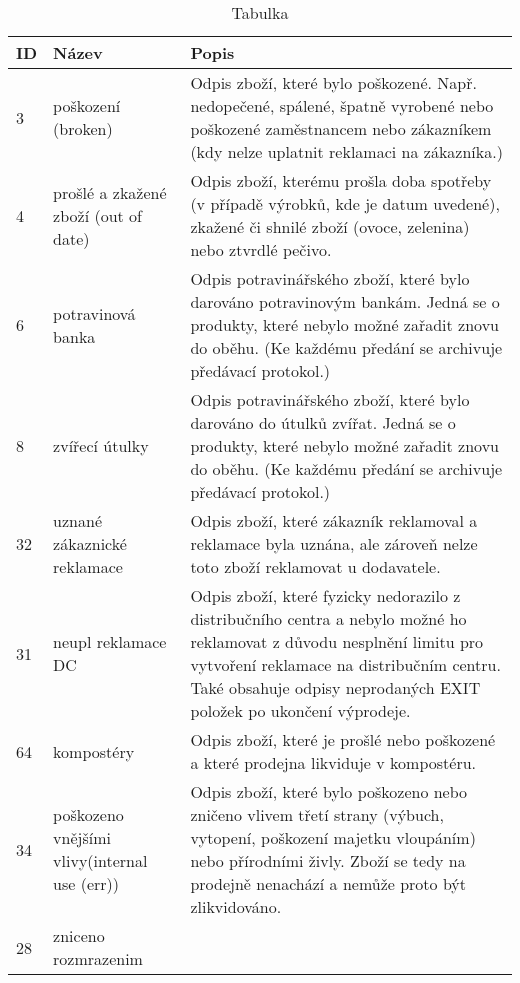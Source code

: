 \begin{table}[]
    \caption{Tabulka}

    \begin{tabular}{p{1cm} p{4cm} p{9cm}}
        ID & Název             & Popis \\
    \hline
    3            & poškození (broken)                 & Odpis zboží, které bylo poškozené. Např. nedopečené, spálené, špatně vyrobené nebo poškozené zaměstnancem nebo zákazníkem (kdy nelze uplatnit reklamaci na zákazníka.)       \\
    4            & prošlé a zkažené zboží (out of date)            & Odpis zboží, kterému prošla doba spotřeby (v případě výrobků, kde je datum uvedené), zkažené či shnilé zboží (ovoce, zelenina) nebo ztvrdlé pečivo.       \\
    6            & potravinová banka      & Odpis potravinářského zboží, které bylo darováno potravinovým bankám. Jedná se o produkty, které nebylo možné zařadit znovu do oběhu. (Ke každému předání se archivuje předávací protokol.)     \\
    8            & zvířecí útulky              & Odpis potravinářského zboží, které bylo darováno do útulků zvířat. Jedná se o produkty, které nebylo možné zařadit znovu do oběhu.  (Ke každému předání se archivuje předávací protokol.)          \\
    32           & uznané zákaznické reklamace   & Odpis zboží, které zákazník reklamoval a reklamace byla uznána, ale zároveň nelze toto zboží reklamovat u dodavatele.      \\
    31           & neupl reklamace DC    &  Odpis zboží, které fyzicky nedorazilo z distribučního centra a nebylo možné ho reklamovat z důvodu nesplnění limitu pro vytvoření reklamace na distribučním centru. Také obsahuje odpisy neprodaných EXIT položek po ukončení výprodeje.     \\
    64           & kompostéry             & Odpis zboží, které je prošlé nebo poškozené a které prodejna likviduje v kompostéru.       \\
    34           & poškozeno vnějšími vlivy(internal use (err))
    & Odpis zboží, které bylo poškozeno nebo zničeno vlivem třetí strany (výbuch, vytopení, poškození majetku vloupáním) nebo přírodními živly. Zboží se tedy na prodejně nenachází a nemůže proto být zlikvidováno.      \\
    28           & zniceno rozmrazenim    &       \\
    \end{tabular}
\end{table}




